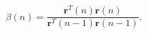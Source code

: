 \begin{equation}
\label{eq:fletcherreeves}
\beta(n) = \frac{\mathbf{r}^T(n) \mathbf{r}(n)}{\mathbf{r}^T(n - 1)
\mathbf{r}(n - 1)}.
\end{equation}

%